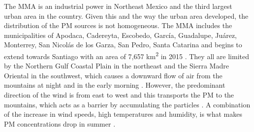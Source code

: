 The MMA is an industrial power in Northeast Mexico and the third largest urban area in the country.
Given this and the way the urban area developed, the distribution of the PM sources is not homogeneous.
The MMA includes the municipalities of Apodaca, Cadereyta, Escobedo, García, Guadalupe, Juárez, Monterrey,
San Nicolás de los Garza, San Pedro, Santa Catarina and begins to extend towards Santiago with an area of 7,657
km\textsuperscript{2} in 2015 \cite{inegi2015}. They all are limited by the Northern Gulf Coastal Plain
in the northeast and the Sierra Madre Oriental in the southwest, which causes a downward flow of
air from the mountains at night and in the early morning \cite{molina2019}. However, the predominant
direction of the wind is from east to west and this transports the PM to the mountains, which acts as a barrier
by accumulating the particles \cite{gonzalez2011}. A combination of the increase in wind speeds,
high temperatures and humidity, is what makes PM concentrations drop in summer
\cite{gonzalez2011,sima2019}.
